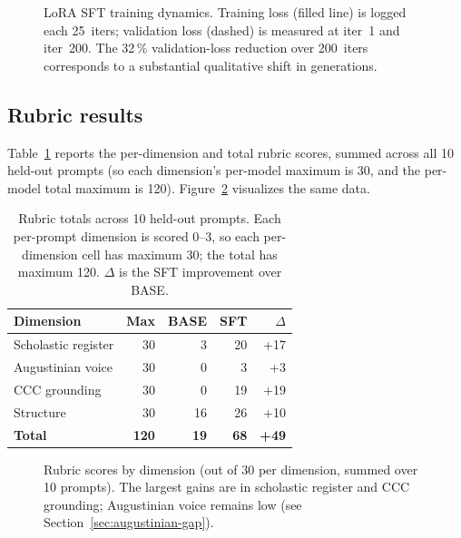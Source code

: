 \begin{figure}[H]
\centering

\caption{LoRA SFT training dynamics. Training loss (filled line) is logged
each 25~iters; validation loss (dashed) is measured at iter~1 and
iter~200. The 32\,\% validation-loss reduction over 200~iters corresponds
to a substantial qualitative shift in generations.}
\label{fig:training}
\end{figure}

\subsection{Rubric results}
\label{sec:rubric-results}

Table~\ref{tab:rubric} reports the per-dimension and total rubric scores,
summed across all 10 held-out prompts (so each dimension's per-model maximum
is 30, and the per-model total maximum is 120).
Figure~\ref{fig:rubric-bars} visualizes the same data.

\begin{table}[H]
\centering
\caption{Rubric totals across 10 held-out prompts. Each per-prompt
dimension is scored 0--3, so each per-dimension cell has maximum 30; the
total has maximum 120. $\Delta$ is the SFT improvement over BASE.}
\label{tab:rubric}
\small
\begin{tabular}{l r r r r}
\toprule
\textbf{Dimension} & \textbf{Max} & \textbf{BASE} & \textbf{SFT} & \textbf{$\Delta$} \\
\midrule
Scholastic register & 30 & 3  & 20 & +17 \\
Augustinian voice   & 30 & 0  & 3  & +3  \\
CCC grounding       & 30 & 0  & 19 & +19 \\
Structure           & 30 & 16 & 26 & +10 \\
\midrule
\textbf{Total}      & \textbf{120} & \textbf{19} & \textbf{68} & \textbf{+49} \\
\bottomrule
\end{tabular}
\end{table}

\begin{figure}[H]
\centering

\caption{Rubric scores by dimension (out of 30 per dimension, summed over
10 prompts). The largest gains are in scholastic register and CCC
grounding; Augustinian voice remains low (see
Section~\ref{sec:augustinian-gap}).}
\label{fig:rubric-bars}
\end{figure}

